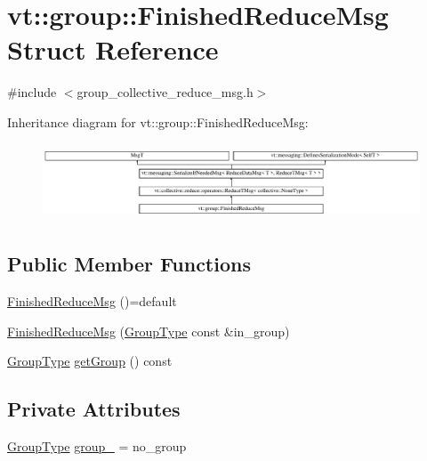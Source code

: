 \hypertarget{structvt_1_1group_1_1_finished_reduce_msg}{}\section{vt\+:\+:group\+:\+:Finished\+Reduce\+Msg Struct Reference}
\label{structvt_1_1group_1_1_finished_reduce_msg}


{\ttfamily \#include $<$group\+\_\+collective\+\_\+reduce\+\_\+msg.\+h$>$}

Inheritance diagram for vt\+:\+:group\+:\+:Finished\+Reduce\+Msg\+:\begin{figure}[H]
\begin{center}
\leavevmode
\includegraphics[height=2.299795cm]{structvt_1_1group_1_1_finished_reduce_msg}
\end{center}
\end{figure}
\subsection*{Public Member Functions}
\begin{DoxyCompactItemize}
\item 
\hyperlink{structvt_1_1group_1_1_finished_reduce_msg_a3916286ab9b8d8b3e9534126abe02edd}{Finished\+Reduce\+Msg} ()=default
\item 
\hyperlink{structvt_1_1group_1_1_finished_reduce_msg_a5be4d7bc5a37d820ba93c02fcf1c4055}{Finished\+Reduce\+Msg} (\hyperlink{namespacevt_a27b5e4411c9b6140c49100e050e2f743}{Group\+Type} const \&in\+\_\+group)
\item 
\hyperlink{namespacevt_a27b5e4411c9b6140c49100e050e2f743}{Group\+Type} \hyperlink{structvt_1_1group_1_1_finished_reduce_msg_af8357b5d9faa6df84ba31746f66ac979}{get\+Group} () const
\end{DoxyCompactItemize}
\subsection*{Private Attributes}
\begin{DoxyCompactItemize}
\item 
\hyperlink{namespacevt_a27b5e4411c9b6140c49100e050e2f743}{Group\+Type} \hyperlink{structvt_1_1group_1_1_finished_reduce_msg_abb883384574d4ace6af3eecd90587c8c}{group\+\_\+} = no\+\_\+group
\end{DoxyCompactItemize}
